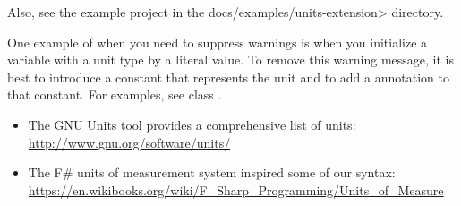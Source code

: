 Also, see the example project in the \<docs/examples/units-extension> directory.




One example of when you need to suppress warnings is when you
initialize a variable with a unit type by a literal value.
To remove this warning message, it is best to introduce a
constant that represents the unit and to
add a 
annotation to that constant.
For examples, see class .



\begin{itemize}
\item The GNU Units tool provides a comprehensive list of units:\\
  \url{http://www.gnu.org/software/units/}

\item The F\# units of measurement system inspired some of our syntax:\\
  \url{https://en.wikibooks.org/wiki/F_Sharp_Programming/Units_of_Measure}

\end{itemize}

